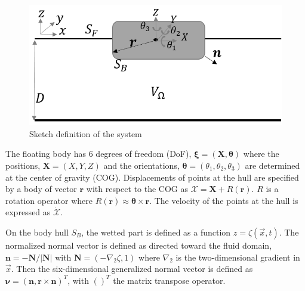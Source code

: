\documentclass[12pt,a4paper,titlepage]{article}
\newcommand{\bs}{\boldsymbol}
\begin{document}
\begin{figure}[ht]
\centering
\includegraphics[scale=0.7,trim = 0mm 0mm 0mm 0mm, clip]{figures/Sketch.png}
\caption{Sketch definition of the system}\label{fig:sketch}
\end{figure}

The floating body has 6 degrees of freedom (DoF), $\bs\xi=(\bs{X},\bs{\theta})$ where the positions, $\bs{X}=(X,Y,Z)$ and the orientations, $\bs{\theta}=(\theta_1,\theta_2,\theta_3)$ are determined at the center of gravity (COG). Displacements of points at the hull are specified by a body of vector $\bs r$ with respect to the COG as $\bs{\mathcal{X}}=\bs{X}+R(\bs{r})$. $R$ is a rotation operator where $R(\bs r)\approx \bs \theta \times \bs r$. The velocity of the points at the hull is expressed as $\dot{\bs{\mathcal{X}}}$.

On the body hull $S_B$, the wetted part is defined as a function $z=\zeta(\vec{x},t)$. The normalized normal vector is defined as directed toward the fluid domain,  $\bs n=-\bs N/|\bs N|$ with $\bs N=\left(-\nabla_2\zeta,1 \right)$ where $\nabla_2$ is the two-dimensional gradient in $\vec{x}$. Then the six-dimensional generalized normal vector is defined as $\bs \nu=(\bs n,\bs r \times \bs n)^T$, with $( )^T$ the matrix transpose operator.
\end{document}
